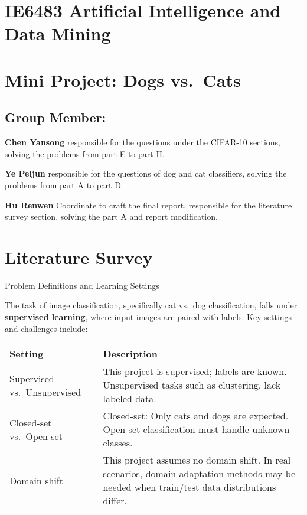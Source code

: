 \section{IE6483 Artificial Intelligence and Data
Mining}\label{ie6483-artificial-intelligence-and-data-mining}

\section{Mini Project: Dogs vs.~Cats}\label{mini-project-dogs-vs.-cats}

\subsection{Group Member:}\label{group-member}

\textbf{Chen Yansong} responsible for the questions under the CIFAR-10
sections, solving the problems from part E to part H.

\textbf{Ye Peijun} responsible for the questions of dog and cat
classifiers, solving the problems from part A to part D

\textbf{Hu Renwen} Coordinate to craft the final report, responsible for
the literature survey section, solving the part A and report
modification.

\section{Literature Survey}\label{literature-survey}

Problem Definitions and Learning Settings

The task of image classification, specifically cat vs.~dog
classification, falls under \textbf{supervised learning}, where input
images are paired with labels. Key settings and challenges include:

\begin{longtable}[]{@{}
  >{\raggedright\arraybackslash}p{}
  >{\raggedright\arraybackslash}p{}@{}}
\toprule\noalign{}
\begin{minipage}[b]{\linewidth}\raggedright
\textbf{Setting}
\end{minipage} & \begin{minipage}[b]{\linewidth}\raggedright
\textbf{Description}
\end{minipage} \\
\midrule\noalign{}
\endhead
\bottomrule\noalign{}
\endlastfoot
Supervised vs.~Unsupervised & This project is supervised; labels are
known. Unsupervised tasks such as clustering, lack labeled data. \\
Closed-set vs.~Open-set & Closed-set: Only cats and dogs are expected.
Open-set classification must handle unknown classes. \\
Domain shift & This project assumes no domain shift. In real scenarios,
domain adaptation methods may be needed when train/test data
distributions differ. \\
\end{longtable}

